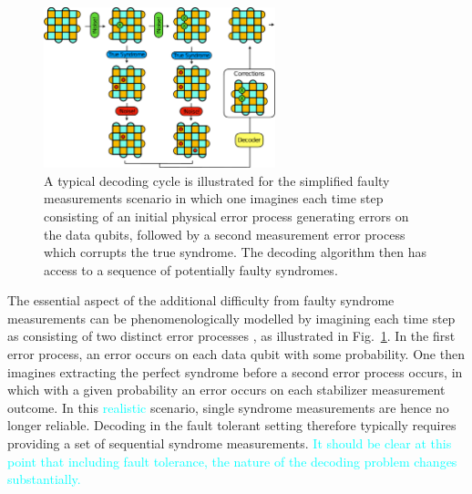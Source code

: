 \documentclass[twocolumn,preprintnumbers,amsmath,amssymb,notitlepage,nofootinbib,longbibliography,superscriptaddress,aps,pra,10pt]{revtex4-1}
\newcommand{\je}[1]{\textcolor{cyan}{#1}}
\begin{document}
	\begin{figure}
	\centering
	\includegraphics[width=0.6\textwidth]{figures/decoding_problem.pdf}
	\caption{
		A typical decoding cycle is illustrated for the simplified faulty measurements scenario in which one imagines each time step consisting of an initial physical error process generating errors on the data qubits, followed by a second measurement error process which corrupts the true syndrome.
		The decoding algorithm then has access to a sequence of potentially faulty syndromes.}\label{f:decoding_problem}
	\end{figure}

	The essential aspect of the additional difficulty from faulty syndrome measurements can be phenomenologically modelled by imagining each time step as consisting of two distinct error processes \cite{stephens2014fault}, as illustrated in Fig.~\ref{f:decoding_problem}.
	In the first error process, an error occurs on each data qubit with some probability.
	One then imagines extracting the perfect syndrome before a second error process occurs, in which with a given probability an error occurs on each stabilizer measurement outcome.
	In this \je{realistic} scenario, single syndrome measurements are hence no longer reliable.
	Decoding in the fault tolerant setting therefore typically requires providing a set of sequential syndrome measurements.
	\je{It should be clear at this point that including fault tolerance, the nature of the decoding problem changes substantially.}
\end{document}
